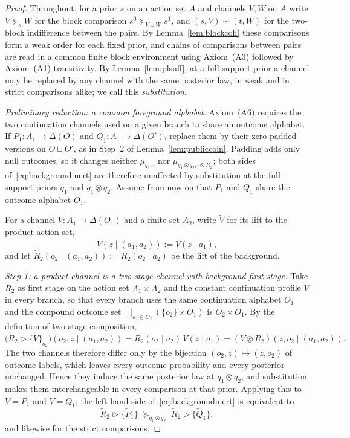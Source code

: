 \documentclass[11pt,a4paper]{article}
\theoremstyle{definition}
\newcommand{\1}{\mathbf 1}
\begin{document}
\begin{proof}
Throughout, for a prior $s$ on an action set $A$ and channels $V,W$ on $A$ write $V\succeq_sW$ for the block comparison
$s^0\succeq_{V\sqcup W}s^1$, and $(s,V)\sim(t,W)$ for the two-block indifference between the pairs.  By
Lemma~\ref{lem:blockcoh} these comparisons form a weak order for each fixed prior, and chains of comparisons between
pairs are read in a common finite block environment using Axiom~\textup{(A3)} followed by Axiom~\textup{(A1)}
transitivity.  By Lemma~\ref{lem:plsuff}, at a full-support prior a channel may be replaced by any channel with the
same posterior law, in weak and in strict comparisons alike; we call this \emph{substitution}.

\emph{Preliminary reduction: a common foreground alphabet.}
Axiom~\textup{(A6)} requires the two continuation channels used on a given branch to share an outcome alphabet.  If
$P_1:A_1\to\Delta(O)$ and $Q_1:A_1\to\Delta(O')$, replace them by their zero-padded versions on $O\sqcup O'$, as in
Step~2 of Lemma~\ref{lem:publiccoin}.  Padding adds only null outcomes, so it changes neither $\mu_{q_1,\cdot}$ nor
$\mu_{q_1\otimes q_2,\cdot\otimes R_2}$; both sides of~\eqref{eq:backgroundinert} are therefore unaffected by
substitution at the full-support priors $q_1$ and $q_1\otimes q_2$.  Assume from now on that $P_1$ and $Q_1$ share the
outcome alphabet $O_1$.

For a channel $V:A_1\to\Delta(O_1)$ and a finite set $A_2$, write $\widetilde V$ for its lift to the product action set,
\[
\widetilde V(z\mid(a_1,a_2)):=V(z\mid a_1),
\]
and let $\widetilde R_2(o_2\mid(a_1,a_2)):=R_2(o_2\mid a_2)$ be the lift of the background.

\emph{Step 1: a product channel is a two-stage channel with background first stage.}
Take $\widetilde R_2$ as first stage on the action set $A_1\times A_2$ and the constant continuation profile
$\widetilde V$ in every branch, so that every branch uses the same continuation alphabet $O_1$ and the compound outcome
set $\bigsqcup_{o_2\in O_2}(\{o_2\}\times O_1)$ is $O_2\times O_1$.  By the definition of two-stage composition,
\[
\bigl(\widetilde R_2\triangleright\{\widetilde V\}_{o_2}\bigr)(o_2,z\mid(a_1,a_2))
=R_2(o_2\mid a_2)\,V(z\mid a_1)
=(V\otimes R_2)(z,o_2\mid (a_1,a_2)).
\]
The two channels therefore differ only by the bijection $(o_2,z)\mapsto(z,o_2)$ of outcome labels, which leaves every
outcome probability and every posterior unchanged.  Hence they induce the same posterior law at $q_1\otimes q_2$, and
substitution makes them interchangeable in every comparison at that prior.  Applying this to $V=P_1$ and $V=Q_1$, the
left-hand side of~\eqref{eq:backgroundinert} is equivalent to
\begin{equation}
\widetilde R_2\triangleright\{\widetilde P_1\}
\;\succeq_{q_1\otimes q_2}\;
\widetilde R_2\triangleright\{\widetilde Q_1\},
\tag{$\ast$}\label{eq:bgcompound}
\end{equation}
and likewise for the strict comparisons.


\end{proof}
\end{document}
